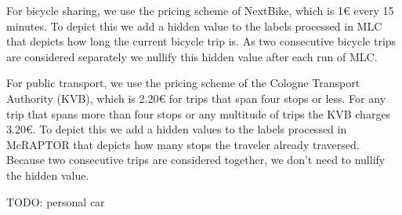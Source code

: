 For bicycle sharing, we use the pricing scheme of NextBike, which is 1€ every 15 minutes.
To depict this we add a hidden value to the labels processed in MLC that depicts how long the current bicycle trip is.
As two consecutive bicycle trips are considered separately we nullify this hidden value after each run of MLC.

For public transport, we use the pricing scheme of the Cologne Transport Authority (KVB), which is 2.20€ for trips that span four stops or less.
For any trip that spans more than four stops or any multitude of trips the KVB charges 3.20€.
To depict this we add a hidden values to the labels processed in McRAPTOR that depicts how many stops the traveler already traversed.
Because two consecutive trips are considered together, we don't need to nullify the hidden value.

TODO: personal car
